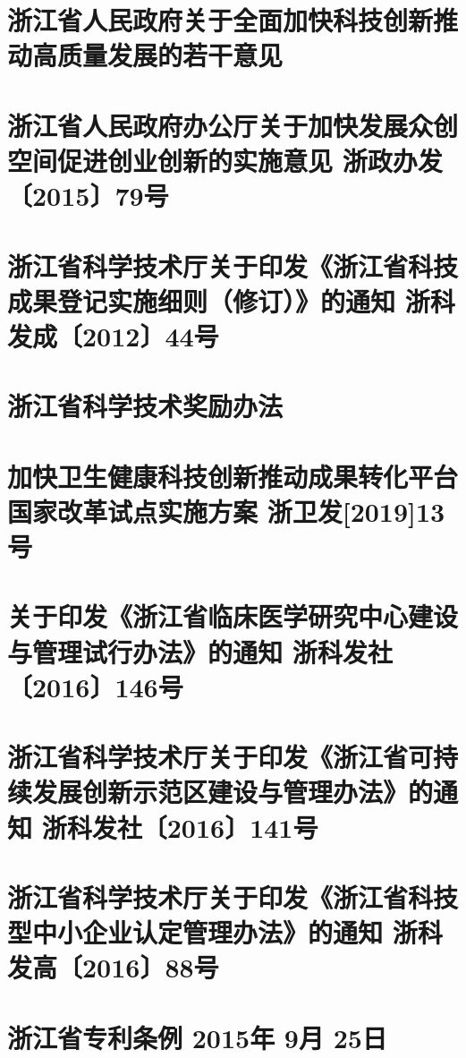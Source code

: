 \documentclass[openany]{book}
\begin{document}
\section{浙江省人民政府关于全面加快科技创新推动高质量发展的若干意见}




\section{浙江省人民政府办公厅关于加快发展众创空间促进创业创新的实施意见		浙政办发〔2015〕79号}


\section{浙江省科学技术厅关于印发《浙江省科技成果登记实施细则（修订）》的通知		浙科发成〔2012〕44号}


\section{浙江省科学技术奖励办法}



\section{加快卫生健康科技创新推动成果转化平台国家改革试点实施方案 浙卫发[2019]13号}



\section{关于印发《浙江省临床医学研究中心建设与管理试行办法》的通知	 浙科发社〔2016〕146号}


\section{浙江省科学技术厅关于印发《浙江省可持续发展创新示范区建设与管理办法》的通知	 浙科发社〔2016〕141号}


\section{浙江省科学技术厅关于印发《浙江省科技型中小企业认定管理办法》的通知	 浙科发高〔2016〕88号}
	

\section{浙江省专利条例		 2015年 9月 25日}
	
\end{document}
